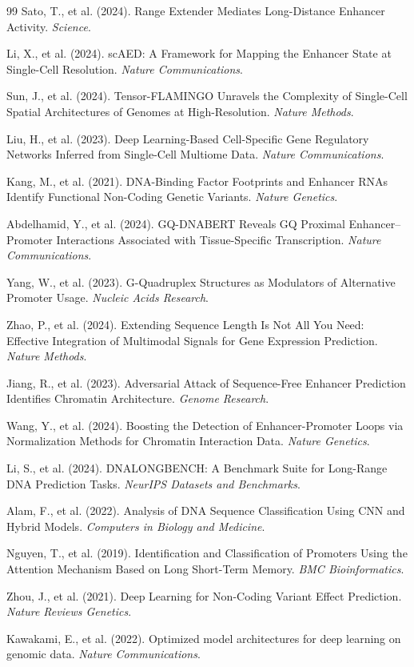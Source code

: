 \documentclass[11pt,a4paper]{article}
\begin{document}
\begin{thebibliography}{99}
Sato, T., et al. (2024). Range Extender Mediates Long-Distance Enhancer Activity. \textit{Science}.

Li, X., et al. (2024). scAED: A Framework for Mapping the Enhancer State at Single-Cell Resolution. \textit{Nature Communications}.

Sun, J., et al. (2024). Tensor-FLAMINGO Unravels the Complexity of Single-Cell Spatial Architectures of Genomes at High-Resolution. \textit{Nature Methods}.

Liu, H., et al. (2023). Deep Learning-Based Cell-Specific Gene Regulatory Networks Inferred from Single-Cell Multiome Data. \textit{Nature Communications}.

Kang, M., et al. (2021). DNA-Binding Factor Footprints and Enhancer RNAs Identify Functional Non-Coding Genetic Variants. \textit{Nature Genetics}.

Abdelhamid, Y., et al. (2024). GQ-DNABERT Reveals GQ Proximal Enhancer--Promoter Interactions Associated with Tissue-Specific Transcription. \textit{Nature Communications}.

Yang, W., et al. (2023). G-Quadruplex Structures as Modulators of Alternative Promoter Usage. \textit{Nucleic Acids Research}.

Zhao, P., et al. (2024). Extending Sequence Length Is Not All You Need: Effective Integration of Multimodal Signals for Gene Expression Prediction. \textit{Nature Methods}.

Jiang, R., et al. (2023). Adversarial Attack of Sequence-Free Enhancer Prediction Identifies Chromatin Architecture. \textit{Genome Research}.

Wang, Y., et al. (2024). Boosting the Detection of Enhancer-Promoter Loops via Normalization Methods for Chromatin Interaction Data. \textit{Nature Genetics}.

Li, S., et al. (2024). DNALONGBENCH: A Benchmark Suite for Long-Range DNA Prediction Tasks. \textit{NeurIPS Datasets and Benchmarks}.

Alam, F., et al. (2022). Analysis of DNA Sequence Classification Using CNN and Hybrid Models. \textit{Computers in Biology and Medicine}.

Nguyen, T., et al. (2019). Identification and Classification of Promoters Using the Attention Mechanism Based on Long Short-Term Memory. \textit{BMC Bioinformatics}.

Zhou, J., et al. (2021). Deep Learning for Non-Coding Variant Effect Prediction. \textit{Nature Reviews Genetics}.

Kawakami, E., et al. (2022). Optimized model architectures for deep learning on genomic data. \textit{Nature Communications}.

\end{thebibliography}
\end{document}
